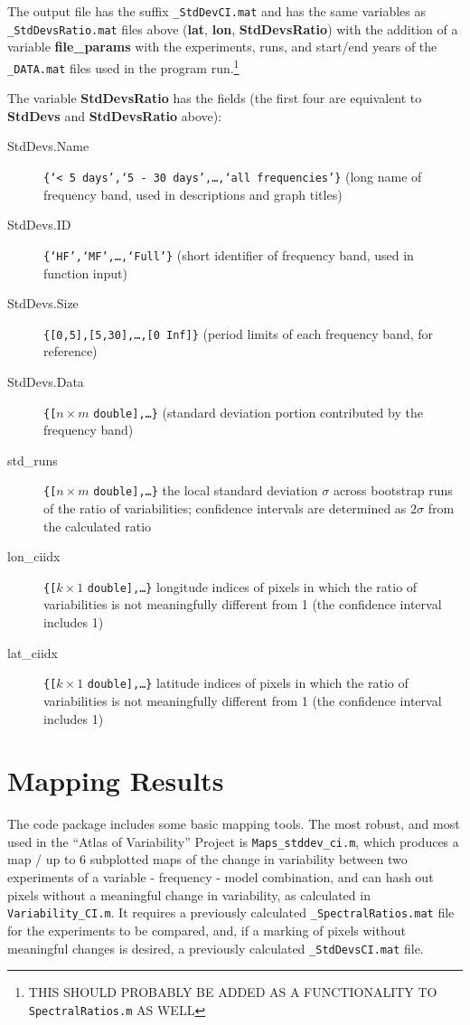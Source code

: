\documentclass{article}
\begin{document}
The output file has the suffix \texttt{\_StdDevCI.mat} and has the same variables as \texttt{\_StdDevsRatio.mat} files above (\textbf{lat}, \textbf{lon}, \textbf{StdDevsRatio}) with the addition of a variable \textbf{file\_params} with the experiments, runs, and start/end years of the \texttt{\_DATA.mat} files used in the program run.\footnote{THIS SHOULD PROBABLY BE ADDED AS A FUNCTIONALITY TO \texttt{SpectralRatios.m} AS WELL}

The variable \textbf{StdDevsRatio} has the fields (the first four are equivalent to \textbf{StdDevs} and \textbf{StdDevsRatio} above):
\begin{description}
\item [StdDevs.Name] \texttt{\{`< 5 days',`5 - 30 days',\dots,`all frequencies'\}} (long name of frequency band, used in descriptions and graph titles)
\item [StdDevs.ID] \texttt{\{`HF',`MF',\dots,`Full'\}} (short identifier of frequency band, used in function input)
\item [StdDevs.Size] \texttt{\{[0,5],[5,30],\dots,[0 Inf]\}} (period limits of each frequency band, for reference)
\item [StdDevs.Data] \texttt{\{[}$n\times m$ \texttt{double],\dots\}} (standard deviation portion contributed by the frequency band)
\item [std\_runs] \texttt{\{[}$n\times m$ \texttt{double],\dots\}} the local standard deviation $\sigma$ across bootstrap runs of the ratio of variabilities; confidence intervals are determined as $2\sigma$ from the calculated ratio
\item [lon\_ciidx] \texttt{\{[}$k\times 1$ \texttt{double],\dots\}} longitude indices of pixels in which the ratio of variabilities is not meaningfully different from 1 (the confidence interval includes 1)
\item [lat\_ciidx] \texttt{\{[}$k\times 1$ \texttt{double],\dots\}} latitude indices of pixels in which the ratio of variabilities is not meaningfully different from 1 (the confidence interval includes 1)
\end{description}


\section{Mapping Results} %
The code package includes some basic mapping tools. The most robust, and most used in the ``Atlas of Variability'' Project is \texttt{Maps\_stddev\_ci.m}, which produces a map / up to 6 subplotted maps of the change in variability between two experiments of a variable - frequency - model combination, and can hash out pixels without a meaningful change in variability, as calculated in \texttt{Variability\_CI.m}. It requires a previously calculated \texttt{\_SpectralRatios.mat} file for the experiments to be compared, and, if a marking of pixels without meaningful changes is desired, a previously calculated \texttt{\_StdDevsCI.mat} file.
\end{document}
